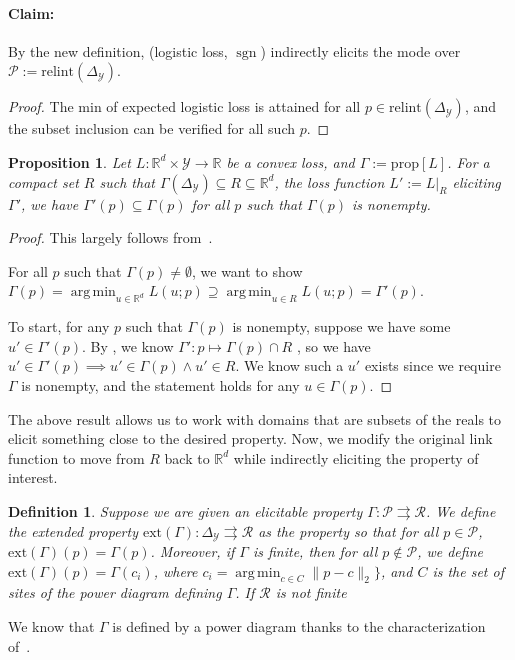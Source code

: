 \documentclass{article}
\newcommand{\reals}{\mathbb{R}}
\newcommand{\simplex}{\Delta_\Y}
\newcommand{\relint}[1]{\mathrm{relint}(#1)}
\newcommand{\prop}[1]{\mathrm{prop}[#1]}
\newcommand{\ext}{\mathrm{ext}}
\newcommand{\R}{\mathcal{R}}
\renewcommand{\P}{\mathcal{P}}
\newcommand{\Y}{\mathcal{Y}}
\newcommand{\toto}{\rightrightarrows}
\newtheorem{proposition}{Proposition}
\newtheorem{definition}{Definition}
\DeclareMathOperator*{\argmin}{arg\,min}
\DeclareMathOperator*{\sgn}{sgn}
\begin{document}
\paragraph{Claim:} By the new definition, (logistic loss, $\sgn$) indirectly elicits the mode over $\P := \relint{\simplex}$.
\begin{proof}
	The min of expected logistic loss is attained for all $p \in \relint{\simplex}$, and the subset inclusion can be verified for all such $p$.
\end{proof}


\begin{proposition}\label{prop:restrict-loss-domain}
	Let $L: \reals^d \times\Y\to\reals$ be a convex loss, and $\Gamma := \prop{L}$.
	For a compact set $R$ such that $\Gamma(\simplex)\subseteq R \subseteq \reals^d$, the loss function $L' := L|_R$ eliciting $\Gamma'$, we have $\Gamma'(p) \subseteq \Gamma(p)$ for all $p$ such that $\Gamma(p)$ is nonempty.
\end{proposition}
\begin{proof}
	This largely follows from~\cite[Lemma 3]{finocchiaro2019embedding}.
	
	For all $p$ such that $\Gamma(p) \neq \emptyset$, we want to show $\Gamma(p) = \argmin_{u \in \reals^d} L(u;p) \supseteq \argmin_{u \in R} L(u;p) = \Gamma'(p)$. 
	
	To start, for any $p$ such that $\Gamma(p)$ is nonempty, suppose we have some $u' \in \Gamma'(p)$.
	By \cite[Lemma 3]{finocchiaro2019embedding}, we know $\Gamma' : p \mapsto \Gamma(p) \cap R$ , so we have $u' \in \Gamma'(p) \implies u' \in \Gamma(p) \wedge u' \in R$.
	We know such a $u'$ exists since we require $\Gamma$ is nonempty, and the statement holds for any $u \in \Gamma(p)$.
\end{proof}

The above result allows us to work with domains that are subsets of the reals to elicit something close to the desired property.
Now, we modify the original link function to move from $R$ back to $\reals^d$ while indirectly eliciting the property of interest. 

\begin{definition}\label{def:extended-prop}
	Suppose we are given an elicitable property $\Gamma: \P \toto \R$.  
	We define the \emph{extended property} $\ext(\Gamma) : \simplex \toto \R$ as the property so that for all $p \in \P$, $\ext(\Gamma)(p) = \Gamma(p)$.
	Moreover, if $\Gamma$ is finite, then for all $p \not \in \P$, we define $\ext(\Gamma)(p) = \Gamma(c_i)$, where $c_i = \argmin_{c \in C} \|p - c\|_2\}$, and $C$ is the set of sites of the power diagram defining $\Gamma$.
	If $\R$ is not finite
\end{definition}
We know that $\Gamma$ is defined by a power diagram thanks to the characterization of~\cite{lambert2009eliciting}.
\end{document}

